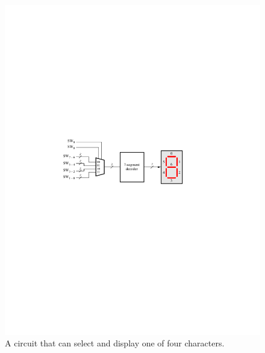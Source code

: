 \documentclass[epsfig,10pt,fullpage]{article}
\begin{document}
\begin{figure}[H]
	\begin{center}
		\includegraphics[]{figures/figure7.pdf}
	\end{center}
\caption{A circuit that can select and display one of four characters.}
\label{fig:7}
\end{figure}
\end{document}
